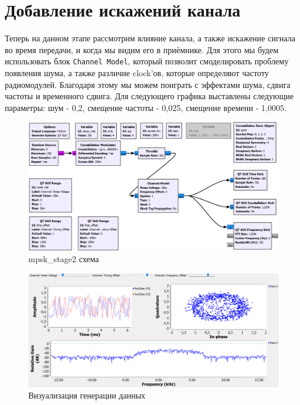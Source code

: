 \documentclass[a4paper,12pt]{report}
\begin{document}
\chapter{Добавление искажений канала}

Теперь на данном этапе рассмотрим влияние канала, а также искажение сигнала во время передачи, и когда мы видим его в приёмнике. Для этого мы будем использовать блок \texttt{Channel Model}, который позволит смоделировать проблему появления шума, а также различие clock'ов, которые определяют частоту радиомодулей. Благодаря этому мы можем поиграть с эффектами шума, сдвига частоты и временного сдвига. Для следующего графика выставлены следующие параметры: шум - 0,2, смещение частоты - 0,025, смещение времени - 1,0005.

\begin{figure}[H]
        \centering
        \includegraphics[width=1.0\textwidth]{lab12_fig2_1.png}
        \caption{mpsk\_stage2 схема}
        \label{fig:lab12_fig2_1}
\end{figure}

\begin{figure}[H]
        \centering
        \includegraphics[width=1.0\textwidth]{lab12_fig2_2.png}
        \caption{Визуализация генерации данных}
        \label{fig:lab12_fig2_2}
\end{figure}
\end{document}

